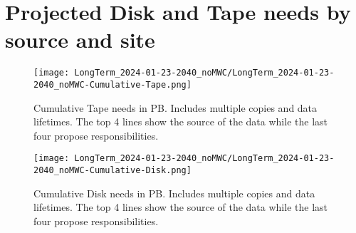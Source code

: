 \section{Projected Disk and Tape needs by source and site}
\begin{figure}[h]
\centering\texttt{[image: LongTerm\_2024-01-23-2040\_noMWC/LongTerm\_2024-01-23-2040\_noMWC-Cumulative-Tape.png]}
\caption{Cumulative Tape needs in PB. Includes multiple copies and data lifetimes. The top 4 lines show the source of the data while the last four propose responsibilities.}
\label{fig:Cumulative-Tape}
\end{figure}
\begin{figure}[h]
\centering\texttt{[image: LongTerm\_2024-01-23-2040\_noMWC/LongTerm\_2024-01-23-2040\_noMWC-Cumulative-Disk.png]}
\caption{Cumulative Disk needs in PB. Includes multiple copies and data lifetimes. The top 4 lines show the source of the data while the last four propose responsibilities.}
\label{fig:Cumulative-Disk}
\end{figure}
